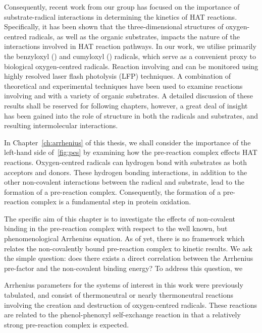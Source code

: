 Consequently, recent work from our group has focused on the importance of substrate-radical interactions in determining the kinetics of HAT reactions. Specifically, it has been shown that the three-dimensional structures of oxygen-centred radicals, as well as the organic substrates, impacts the nature of the interactions involved in HAT reaction pathways.\cite{Salamone2015Rev} In our work, we utilise primarily the benzyloxyl (\bno) and cumyloxyl (\cumo) radicals, which serve as a convenient proxy to biological oxygen-centred radicals. Reaction involving \bno and \cumo can be monitored using highly resolved laser flash photolysis (LFP) techniques. A combination of theoretical and experimental techniques have been used to examine reactions involving \bno and \cumo with a variety of organic substrates. A detailed discussion of these results shall be reserved for following chapters, however, a great deal of insight has been gained into the role of structure in both the radicals and substrates, and resulting intermolecular interactions.

In Chapter~\ref{ch:arrhenius} of this thesis, we shall consider the importance of the left-hand side of~\ref{fig:pes} by examining how the pre-reaction complex effects HAT reactions. Oxygen-centred radicals can hydrogen bond with substrates as both acceptors and donors.\cite{Johnson2009a} These hydrogen bonding interactions, in addition to the other non-covalent interactions between the radical and substrate, lead to the formation of a pre-reaction complex. Consequently, the formation of a pre-reaction complex is a fundamental step in protein oxidation.

The specific aim of this chapter is to investigate the effects of non-covalent binding in the pre-reaction complex with respect to the well known, but phenomenological Arrhenius equation. As of yet, there is no framework which relates the non-covalently bound pre-reaction complex to kinetic results. We ask the simple question: does there exists a direct correlation between the Arrhenius pre-factor and the non-covalent binding energy? To address this question, we 

Arrhenius parameters for the systems of interest in this work were previously tabulated,\cite{DiLabio2005} and consist of thermoneutral or nearly thermoneutral reactions involving the creation and destruction of oxygen-centred radicals. These reactions are related to the phenol-phenoxyl self-exchange reaction in that a relatively strong pre-reaction complex is expected.



